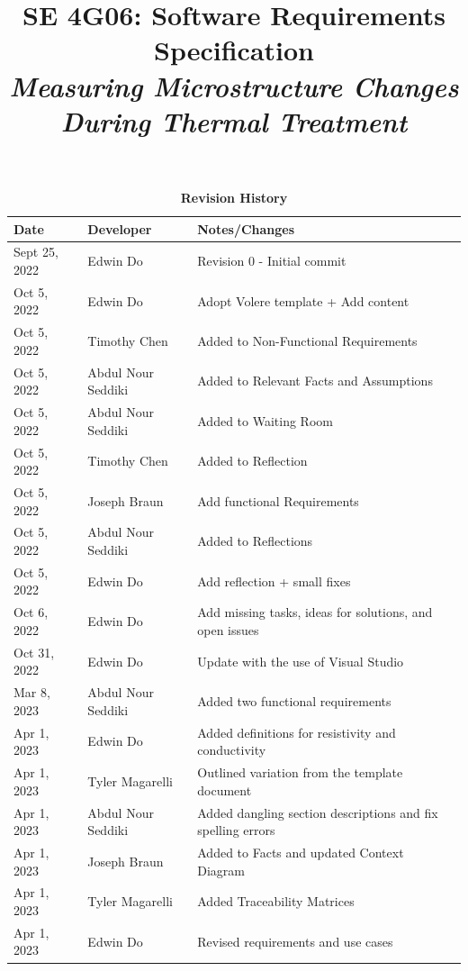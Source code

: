 \documentclass[12pt, titlepage]{article}
\title{SE 4G06: Software Requirements Specification\\\textit{Measuring Microstructure Changes During Thermal Treatment }}
\author{\authname}
\date{}
\begin{document}
\maketitle

\tableofcontents
\listoftables
\listoffigures

\begin{table}[H]
\caption{\bf Revision History}
\begin{tabularx}{\textwidth}{p{2.5cm}p{2.5cm}X}
\toprule {\bf Date} & {\bf Developer} & {\bf Notes/Changes}\\
\midrule
Sept 25, 2022 & Edwin Do & Revision 0 - Initial commit\\
Oct 5, 2022 & Edwin Do & Adopt Volere template + Add content \\
Oct 5, 2022 & Timothy Chen & Added to Non-Functional Requirements\\
Oct 5, 2022 & Abdul Nour Seddiki & Added to Relevant Facts and Assumptions\\
Oct 5, 2022 & Abdul Nour Seddiki & Added to Waiting Room\\
Oct 5, 2022 & Timothy Chen & Added to Reflection\\
Oct 5, 2022 & Joseph Braun & Add functional Requirements \\ 
Oct 5, 2022 & Abdul Nour Seddiki & Added to Reflections\\
Oct 5, 2022 & Edwin Do & Add reflection + small fixes \\
Oct 6, 2022 & Edwin Do & Add missing tasks, ideas for solutions, and open issues \\
Oct 31, 2022 & Edwin Do & Update with the use of Visual Studio\\
Mar 8, 2023 & Abdul Nour Seddiki & Added two functional requirements\\
Apr 1, 2023 & Edwin Do & Added definitions for resistivity and conductivity\\
Apr 1, 2023 & Tyler Magarelli & Outlined variation from the template document \\
Apr 1, 2023 & Abdul Nour Seddiki & Added dangling section descriptions and fix spelling errors\\
Apr 1, 2023 & Joseph Braun & Added to Facts and updated Context Diagram\\
Apr 1, 2023 & Tyler Magarelli & Added Traceability Matrices\\
Apr 1, 2023 & Edwin Do & Revised requirements and use cases\\
\bottomrule
\end{tabularx}
\end{table}
\end{document}
